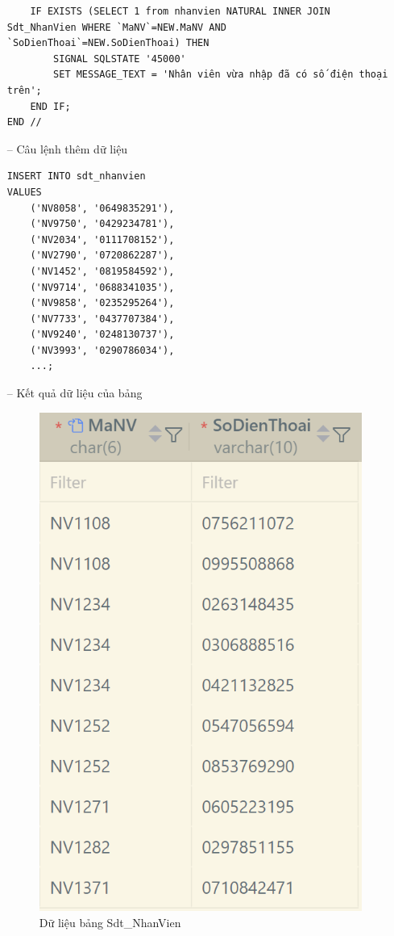 \begin{itemize}
\begin{verbatim}
    IF EXISTS (SELECT 1 from nhanvien NATURAL INNER JOIN Sdt_NhanVien WHERE `MaNV`=NEW.MaNV AND `SoDienThoai`=NEW.SoDienThoai) THEN
        SIGNAL SQLSTATE '45000'
        SET MESSAGE_TEXT = 'Nhân viên vừa nhập đã có số điện thoại trên';
    END IF;
END //
    \end{verbatim}
    \newpage
    \item [--] Câu lệnh thêm dữ liệu
   \begin{verbatim}
INSERT INTO sdt_nhanvien 
VALUES 
    ('NV8058', '0649835291'),
    ('NV9750', '0429234781'),
    ('NV2034', '0111708152'),
    ('NV2790', '0720862287'),
    ('NV1452', '0819584592'),
    ('NV9714', '0688341035'),
    ('NV9858', '0235295264'),
    ('NV7733', '0437707384'),
    ('NV9240', '0248130737'),
    ('NV3993', '0290786034'),
    ...;
    \end{verbatim}
    \item [--] Kết quả dữ liệu của bảng
    \begin{figure}[H]
        \centering
        \includegraphics[width=0.5\linewidth]{content/images/data_sdtNV.png}
        \caption{Dữ liệu bảng Sdt\_NhanVien}
        \label{fig:data_sdtNV}
    \end{figure}
\end{itemize}
\newpage
